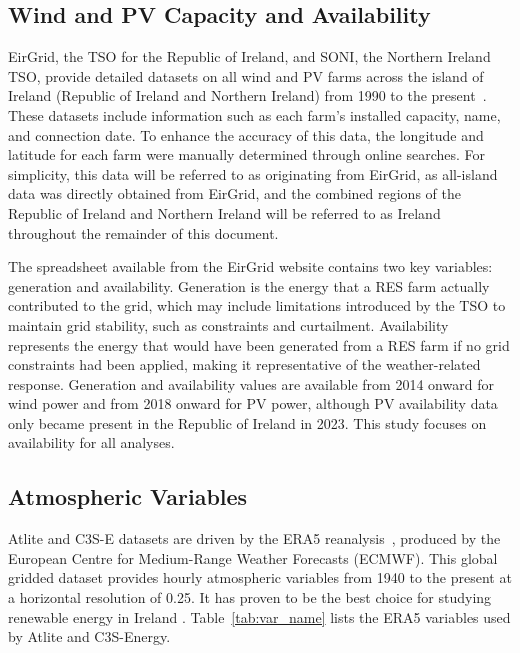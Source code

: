 \documentclass[preprint, 12pt]{elsarticle}
\begin{document}
\subsection{Wind and PV Capacity and Availability}
\label{sec:eirgrid}

EirGrid, the TSO for the Republic of Ireland, and SONI, the Northern Ireland TSO, provide detailed datasets on all wind and PV farms across the island of Ireland (Republic of Ireland and Northern Ireland) from 1990 to the present~\citep{eirgrid2023spreadsheet}. These datasets include information such as each farm’s installed capacity, name, and connection date. To enhance the accuracy of this data, the longitude and latitude for each farm were manually determined through online searches. For simplicity, this data will be referred to as originating from EirGrid, as all-island data was directly obtained from EirGrid, and the combined regions of the Republic of Ireland and Northern Ireland will be referred to as Ireland throughout the remainder of this document.

The spreadsheet available from the EirGrid website contains two key variables: generation and availability. Generation is the energy that a RES farm actually contributed to the grid, which may include limitations introduced by the TSO to maintain grid stability, such as constraints and curtailment. Availability represents the energy that would have been generated from a RES farm if no grid constraints had been applied, making it representative of the weather-related response. Generation and availability values are available from 2014 onward for wind power and from 2018 onward for PV power, although PV availability data only became present in the Republic of Ireland in 2023. This study focuses on availability for all analyses.

\subsection{Atmospheric Variables}
\label{sec:era5}

Atlite and C3S-E datasets are driven by the ERA5 reanalysis~\citep{hersbach2020era5}, produced by the European Centre for Medium-Range Weather Forecasts (ECMWF). This global gridded dataset provides hourly atmospheric variables from 1940 to the present at a horizontal resolution of 0.25\textdegree. It has proven to be the best choice for studying renewable energy in Ireland \citep{doddy2021era5}. Table~\ref{tab:var_name} lists the ERA5 variables used by Atlite and C3S-Energy.
\end{document}
